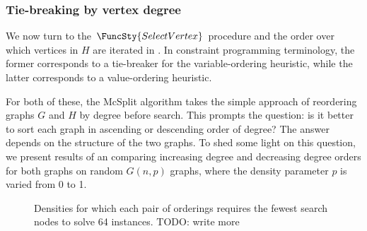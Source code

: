 \subsubsection{Tie-breaking by vertex degree}

We now turn to the $\FuncSty{SelectVertex}$ procedure and the order over which
vertices in $H$ are iterated in .  In constraint programming
terminology, the former corresponds to a tie-breaker for the variable-ordering
heuristic, while the latter corresponds to a value-ordering heuristic.

For both of these, the McSplit algorithm takes the simple approach of reordering
graphs $G$ and $H$ by degree before search.  This prompts the question: is it
better to sort each graph in ascending or descending order of degree?  The answer depends on the structure of the two graphs.  To shed some light on this question, we present results of an comparing increasing degree and decreasing degree orders for both graphs on random $G(n,p)$ graphs, where the density parameter $p$
is varied from 0 to 1.

\begin{figure}[h!]
    \centering
    \caption{Densities for which each pair of orderings requires the fewest search nodes to solve 64 instances. TODO: write more} \label{figure:winners10}
\end{figure}

